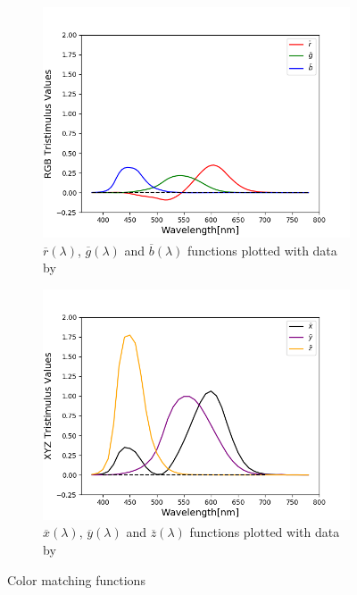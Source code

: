 \begin{figure}[t]
	\centering
	\begin{subfigure}{0.46\textwidth}
		\includegraphics[width=\linewidth]{img/matching_functions_rgb.png}
		\caption{ $\overline{r}(\lambda)$, $\overline{g}(\lambda)$ and $\overline{b}(\lambda)$ functions plotted with data by~\citet{colorMatchingRGBData}}
		\label{fig:colorMatchingRGB}
	\end{subfigure}
	\quad
	\begin{subfigure}{0.46\textwidth}
		\includegraphics[width=\linewidth]{img/matching_functions_xyz.png}
		\caption{$\overline{x}(\lambda)$, $\overline{y}(\lambda)$ and $\overline{z}(\lambda)$ functions plotted with data by~\citet{colorMatchingXYZData}}
		\label{fig:colorMatchingXYZ}
	\end{subfigure}
	\caption{Color matching functions}
	\label{fig:colorMatchingFunctions}
\end{figure}

